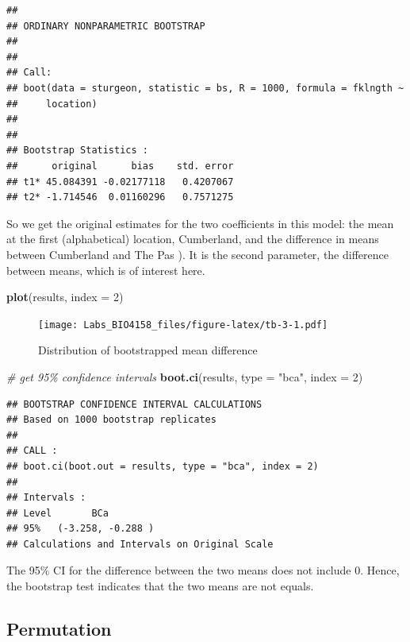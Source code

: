 \documentclass[
  12pt,
]{book}
\newenvironment{Shaded}{\begin{snugshade}}{\end{snugshade}}
\newcommand{\CommentTok}[1]{\textcolor[rgb]{0.56,0.35,0.01}{\textit{#1}}}
\newcommand{\DataTypeTok}[1]{\textcolor[rgb]{0.13,0.29,0.53}{#1}}
\newcommand{\DecValTok}[1]{\textcolor[rgb]{0.00,0.00,0.81}{#1}}
\newcommand{\KeywordTok}[1]{\textcolor[rgb]{0.13,0.29,0.53}{\textbf{#1}}}
\newcommand{\NormalTok}[1]{#1}
\newcommand{\StringTok}[1]{\textcolor[rgb]{0.31,0.60,0.02}{#1}}
\begin{document}
\begin{verbatim}
## 
## ORDINARY NONPARAMETRIC BOOTSTRAP
## 
## 
## Call:
## boot(data = sturgeon, statistic = bs, R = 1000, formula = fklngth ~ 
##     location)
## 
## 
## Bootstrap Statistics :
##      original      bias    std. error
## t1* 45.084391 -0.02177118   0.4207067
## t2* -1.714546  0.01160296   0.7571275
\end{verbatim}

So we get the original estimates for the two coefficients in this model: the mean at the first (alphabetical) location, Cumberland, and the difference in means between Cumberland and The Pas ). It is the second parameter, the difference between means, which is of interest here.

\begin{Shaded}
\begin{Highlighting}[]
\KeywordTok{plot}\NormalTok{(results, }\DataTypeTok{index =} \DecValTok{2}\NormalTok{)}
\end{Highlighting}
\end{Shaded}

\begin{figure}
\centering
\texttt{[image: Labs\_BIO4158\_files/figure-latex/tb-3-1.pdf]}
\caption{\label{fig:tb-3}Distribution of bootstrapped mean difference}
\end{figure}

\begin{Shaded}
\begin{Highlighting}[]
\CommentTok{\# get 95\% confidence intervals}
\KeywordTok{boot.ci}\NormalTok{(results, }\DataTypeTok{type =} \StringTok{"bca"}\NormalTok{, }\DataTypeTok{index =} \DecValTok{2}\NormalTok{)}
\end{Highlighting}
\end{Shaded}

\begin{verbatim}
## BOOTSTRAP CONFIDENCE INTERVAL CALCULATIONS
## Based on 1000 bootstrap replicates
## 
## CALL : 
## boot.ci(boot.out = results, type = "bca", index = 2)
## 
## Intervals : 
## Level       BCa          
## 95%   (-3.258, -0.288 )  
## Calculations and Intervals on Original Scale
\end{verbatim}

The 95\% CI for the difference between the two means does not include 0. Hence, the bootstrap test indicates that the two means are not equals.

\hypertarget{permutation}{%
\subsection{Permutation}\label{permutation}}
\end{document}
